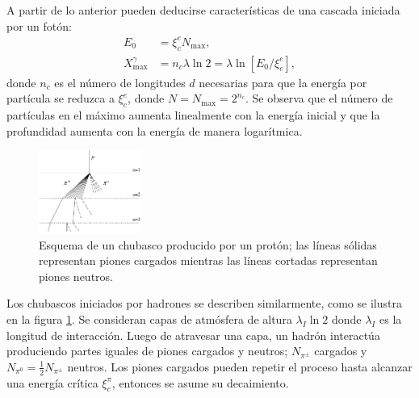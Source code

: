 		A partir de lo anterior pueden deducirse características de una cascada iniciada por un fotón:
		\begin{align}
		E_0 &= \xi ^e_c N_{\text{max}} \label{e0_em}, \\
		X^{\gamma}_{\text{max}} &= n_c \lambda \ln 2 = \lambda \ln[E_0/\xi ^e_c] \label{xmax_em},
		\end{align}
		donde $n_c$ es el número de longitudes $d$ necesarias para que la energía por partícula se reduzca a $\xi_c^e$, donde $N = N_{\text{max}}= 2^{n_c}$. Se observa que el número de partículas en el máximo aumenta linealmente con la energía inicial y que la profundidad aumenta con la energía de manera logarítmica.
		\begin{figure}
		\includegraphics[width=0.3\textwidth]{Figuras/heitler_h.png} 
		\caption{Esquema de un chubasco producido por un protón; las líneas sólidas representan piones cargados mientras las líneas cortadas representan piones neutros.}
		\label{fig:heitler_h}
		\end{figure}	 
		Los chubascos iniciados por hadrones se describen similarmente, como se ilustra en la figura \ref{fig:heitler_h}. Se consideran capas de atmósfera de altura $\lambda_I \ln 2$ donde $\lambda_I$ es la longitud de interacción. Luego de atravesar una capa, un hadrón interactúa produciendo partes iguales de piones cargados y neutros; $N_{\pi^{\pm}}$ cargados y $N_{\pi^{0}}=\frac{1}{2}N_{\pi^{\pm}}$ neutros. Los piones cargados pueden repetir el proceso hasta alcanzar una energía crítica $\xi_c^{\pi}$, entonces se asume su decaimiento. \\
		
